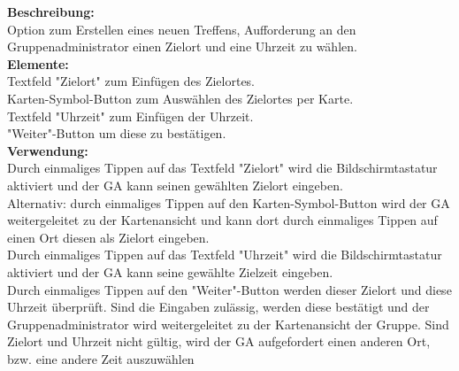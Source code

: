 \begin{figure}
\end{figure}

\textbf{Beschreibung:}\\
Option zum Erstellen eines neuen Treffens, Aufforderung an den Gruppenadministrator einen Zielort und eine Uhrzeit zu wählen.\\
\textbf{Elemente:}\\
Textfeld "Zielort" zum Einfügen des Zielortes.\\
Karten-Symbol-Button zum Auswählen des Zielortes per Karte.\\
Textfeld "Uhrzeit" zum Einfügen der Uhrzeit.\\
"Weiter"-Button um diese zu bestätigen.\\
\textbf{Verwendung:}\\
Durch einmaliges Tippen auf das Textfeld "Zielort" wird die Bildschirmtastatur aktiviert und der GA kann seinen gewählten Zielort eingeben.\\
Alternativ: durch einmaliges Tippen auf den Karten-Symbol-Button wird der GA weitergeleitet zu der Kartenansicht und kann dort durch einmaliges Tippen auf einen Ort diesen als Zielort eingeben.\\
Durch einmaliges Tippen auf das Textfeld "Uhrzeit" wird die Bildschirmtastatur aktiviert und der GA kann seine gewählte Zielzeit eingeben.\\
Durch einmaliges Tippen auf den "Weiter"-Button werden dieser Zielort und diese Uhrzeit überprüft. Sind die Eingaben zulässig, werden diese bestätigt und der Gruppenadministrator wird weitergeleitet zu der Kartenansicht der Gruppe. Sind Zielort und Uhrzeit nicht gültig, wird der GA aufgefordert einen anderen Ort, bzw. eine andere Zeit auszuwählen
\newpage



